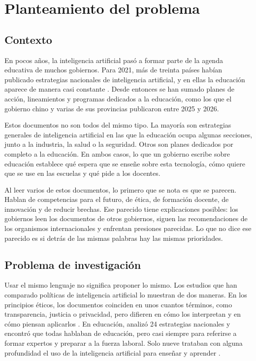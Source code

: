 
\chapter{Planteamiento del problema}
\label{cap:planteamiento}

\section{Contexto}
\label{sec:contexto}

En pocos años, la inteligencia artificial pasó a formar parte de la agenda educativa de
muchos gobiernos. Para 2021, más de treinta países habían publicado estrategias nacionales
de inteligencia artificial, y en ellas la educación aparece de manera casi constante
\citep[p.~527]{schiff2022education}. Desde entonces se han sumado planes de acción,
lineamientos y programas dedicados a la educación, como los que el gobierno chino y varias
de sus provincias publicaron entre 2025 y 2026.

Estos documentos no son todos del mismo tipo. La mayoría son estrategias generales de
inteligencia artificial en las que la educación ocupa algunas secciones, junto a la
industria, la salud o la seguridad. Otros son planes dedicados por completo a la educación.
En ambos casos, lo que un gobierno escribe sobre educación establece qué espera que se
enseñe sobre esta tecnología, cómo quiere que se use en las escuelas y qué pide a los
docentes.

Al leer varios de estos documentos, lo primero que se nota es que se parecen. Hablan de
competencias para el futuro, de ética, de formación docente, de innovación y de reducir
brechas. Ese parecido tiene explicaciones posibles: los gobiernos leen los documentos de
otros gobiernos, siguen las recomendaciones de los organismos internacionales y enfrentan
presiones parecidas. Lo que no dice ese parecido es si detrás de las mismas palabras hay
las mismas prioridades.

\section{Problema de investigación}
\label{sec:problema}

Usar el mismo lenguaje no significa proponer lo mismo. Los estudios que han comparado
políticas de inteligencia artificial lo muestran de dos maneras. En los principios éticos,
los documentos coinciden en unos cuantos términos, como transparencia, justicia o
privacidad, pero difieren en cómo los interpretan y en cómo piensan aplicarlos
\citep{jobin2019landscape, fjeld2020principled}. En educación, \citet{schiff2022education}
analizó 24 estrategias nacionales y encontró que todas hablaban de educación, pero casi
siempre para referirse a formar expertos y preparar a la fuerza laboral. Solo nueve
trataban con alguna profundidad el uso de la inteligencia artificial para enseñar y
aprender \citep[p.~535]{schiff2022education}.

